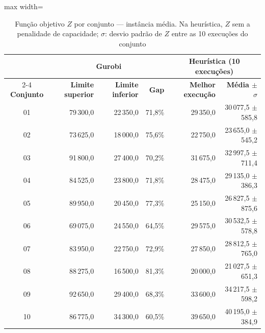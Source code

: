 \begin{table}[htbp]
    \caption{Função objetivo $Z$ por conjunto --- instância média. Na heurística, $Z$ sem a penalidade de capacidade; $\sigma$: desvio padrão de $Z$ entre as 10 execuções do conjunto}
    \label{tab:res-z-medio}
    \centering
    \begin{adjustbox}{max width=\textwidth}
    \begin{tabular}{crrrrr}
        \hline
        & \multicolumn{3}{c}{\textbf{Gurobi}} & \multicolumn{2}{c}{\textbf{Heurística (10 execuções)}} \\
        \cline{2-4} \cline{5-6}
        \textbf{Conjunto} & \textbf{Limite superior} & \textbf{Limite inferior} & \textbf{Gap} & \textbf{Melhor execução} & \textbf{Média $\pm$ $\sigma$} \\
        \hline
        01 & 79\,300,0 & 22\,350,0 & 71,8\% & 29\,350,0 & 30\,077,5 $\pm$ 585,8 \\
        02 & 73\,625,0 & 18\,000,0 & 75,6\% & 22\,750,0 & 23\,655,0 $\pm$ 545,2 \\
        03 & 91\,800,0 & 27\,400,0 & 70,2\% & 31\,675,0 & 32\,997,5 $\pm$ 711,4 \\
        04 & 84\,525,0 & 23\,800,0 & 71,8\% & 28\,475,0 & 29\,135,0 $\pm$ 386,3 \\
        05 & 89\,950,0 & 20\,450,0 & 77,3\% & 25\,150,0 & 26\,827,5 $\pm$ 875,6 \\
        06 & 69\,075,0 & 24\,550,0 & 64,5\% & 29\,575,0 & 30\,532,5 $\pm$ 578,8 \\
        07 & 83\,950,0 & 22\,750,0 & 72,9\% & 27\,850,0 & 28\,812,5 $\pm$ 765,0 \\
        08 & 88\,275,0 & 16\,500,0 & 81,3\% & 20\,000,0 & 21\,027,5 $\pm$ 651,3 \\
        09 & 92\,650,0 & 29\,400,0 & 68,3\% & 33\,600,0 & 34\,217,5 $\pm$ 598,2 \\
        10 & 86\,775,0 & 34\,300,0 & 60,5\% & 39\,650,0 & 40\,195,0 $\pm$ 384,9 \\
        \hline
    \end{tabular}
    \end{adjustbox}
\end{table}

